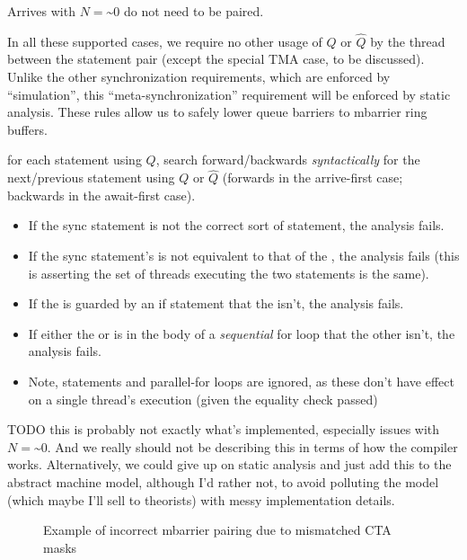 Arrives with $N = \text{\textasciitilde}0$ do not need to be paired.

\filbreak
In all these supported cases, we require no other usage of $Q$ or $\widehat{Q}$ by the thread between the statement pair (except the special TMA case, to be discussed).
Unlike the other synchronization requirements, which are enforced by ``simulation'', this ``meta-synchronization'' requirement will be enforced by static analysis.
These rules allow us to safely lower queue barriers to mbarrier ring buffers.

 for each  statement using $Q$, search forward/backwards \textit{syntactically} for the next/previous statement using $Q$ or $\widehat{Q}$ (forwards in the arrive-first case; backwards in the await-first case).
\filbreak
\begin{itemize}
  \item If the sync statement is not the correct sort of  statement, the analysis fails.
  \filbreak
  \item If the sync statement's  is not equivalent to that of the , the analysis fails (this is asserting the set of threads executing the two statements is the same).
  \filbreak
  \item If the  is guarded by an if statement that the  isn't, the analysis fails.
  \filbreak
  \item If either the  or  is in the body of a \textit{sequential} for loop that the other isn't, the analysis fails.
  \filbreak
  \item Note,  statements and parallel-for loops are ignored, as these don't have effect on a single thread's execution (given the  equality check passed)
\end{itemize}

TODO this is probably not exactly what's implemented, especially issues with $N = \text{\textasciitilde}0$.
And we really should not be describing this in terms of how the compiler works.
Alternatively, we could give up on static analysis and just add this to the abstract machine model, although I'd rather not, to avoid polluting the model (which maybe I'll sell to theorists) with messy implementation details.

\begin{figure*}[!b]

\caption{Example of incorrect mbarrier pairing due to mismatched CTA masks} \label{fig:multicast_pairing_fail}
\end{figure*}

